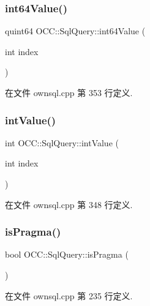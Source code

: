 \subsubsection{\texorpdfstring{int64\+Value()}{int64Value()}}
{\footnotesize\ttfamily quint64 O\+C\+C\+::\+Sql\+Query\+::int64\+Value (\begin{DoxyParamCaption}\item[{int}]{index }\end{DoxyParamCaption})}



在文件 ownsql.\+cpp 第 353 行定义.

\mbox{\label{class_o_c_c_1_1_sql_query_ad3ab48614ddc04693d6a94d471b64979}} 
\subsubsection{\texorpdfstring{int\+Value()}{intValue()}}
{\footnotesize\ttfamily int O\+C\+C\+::\+Sql\+Query\+::int\+Value (\begin{DoxyParamCaption}\item[{int}]{index }\end{DoxyParamCaption})}



在文件 ownsql.\+cpp 第 348 行定义.

\mbox{\label{class_o_c_c_1_1_sql_query_a794e4f9b600bd4273b5b567d46dce3d4}} 
\subsubsection{\texorpdfstring{is\+Pragma()}{isPragma()}}
{\footnotesize\ttfamily bool O\+C\+C\+::\+Sql\+Query\+::is\+Pragma (\begin{DoxyParamCaption}{ }\end{DoxyParamCaption})}



在文件 ownsql.\+cpp 第 235 行定义.

\mbox{\label{class_o_c_c_1_1_sql_query_a4eec84c4f083c32719807b2e7759a99f}} 
